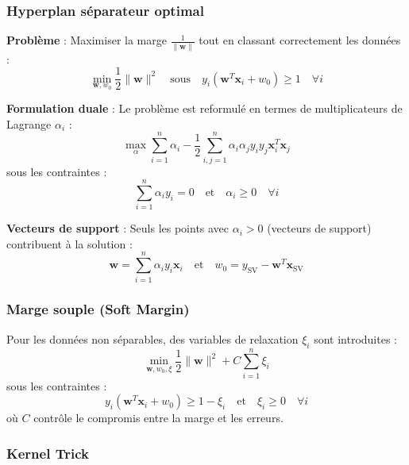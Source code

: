 \documentclass[a4paper,portrait]{article}
\begin{document}
\begin{multicols}{2}
\subsubsection{Hyperplan séparateur optimal}

\textbf{Problème} : Maximiser la marge \( \frac{1}{\|\mathbf{w}\|} \) tout en classant correctement les données :
\[
\min_{\mathbf{w}, w_0} \frac{1}{2} \|\mathbf{w}\|^2 \quad \text{sous} \quad y_i (\mathbf{w}^T \mathbf{x}_i + w_0) \geq 1 \quad \forall i
\]

\textbf{Formulation duale} : Le problème est reformulé en termes de multiplicateurs de Lagrange \( \alpha_i \) :
\[
\max_{\alpha} \sum_{i=1}^n \alpha_i - \frac{1}{2} \sum_{i,j=1}^n \alpha_i \alpha_j y_i y_j \mathbf{x}_i^T \mathbf{x}_j
\]
sous les contraintes :
\[
\sum_{i=1}^n \alpha_i y_i = 0 \quad \text{et} \quad \alpha_i \geq 0 \quad \forall i
\]

\textbf{Vecteurs de support} : Seuls les points avec \( \alpha_i > 0 \) (vecteurs de support) contribuent à la solution :
\[
\mathbf{w} = \sum_{i=1}^n \alpha_i y_i \mathbf{x}_i \quad \text{et} \quad w_0 = y_{\text{SV}} - \mathbf{w}^T \mathbf{x}_{\text{SV}}
\]


\subsubsection{Marge souple (Soft Margin)}

Pour les données non séparables, des variables de relaxation \( \xi_i \) sont introduites :
\[
\min_{\mathbf{w}, w_0, \xi} \frac{1}{2} \|\mathbf{w}\|^2 + C \sum_{i=1}^n \xi_i
\]
sous les contraintes :
\[
y_i (\mathbf{w}^T \mathbf{x}_i + w_0) \geq 1 - \xi_i \quad \text{et} \quad \xi_i \geq 0 \quad \forall i
\]
où \( C \) contrôle le compromis entre la marge et les erreurs.

\subsubsection{Kernel Trick}


\end{multicols}
\end{document}
